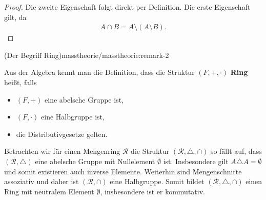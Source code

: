 \begin{proof}
 Die zweite Eigenschaft folgt direkt per Definition. Die erste Eigenschaft gilt, da
\begin{align*}
A\cap B = A\setminus (A\setminus B).
\end{align*}\end{proof}
\begin{remark}{(Der Begriff Ring)}{masstheorie/masstheorie:remark-2}



\par
Aus der Algebra kennt man die Definition, dass die Struktur \((F,+,\cdot)\) \textbf{Ring} heißt, falls
\begin{itemize}
\item {} 
\par
\((F,+)\) eine abelsche Gruppe ist,

\item {} 
\par
\((F,\cdot)\) eine Halbgruppe ist,

\item {} 
\par
die Distributivgesetze gelten.

\end{itemize}

\par
Betrachten wir für einen Mengenring \(\mathcal{R}\) die Struktur \((\mathcal{R}, \triangle, \cap)\) so fällt auf, dass \((\mathcal{R},\triangle)\) eine abelsche Gruppe mit Nullelement \(\emptyset\) ist. Insbesondere gilt \(A\triangle A=\emptyset\) und somit existieren auch inverse Elemente. Weiterhin sind Mengenschnitte assoziativ und daher ist \((\mathcal{R}, \cap)\) eine Halbgruppe. Somit bildet \((\mathcal{R},\triangle,\cap)\) einen Ring mit neutralem Element \(\emptyset\), insbesondere ist er kommutativ.
\end{remark}

